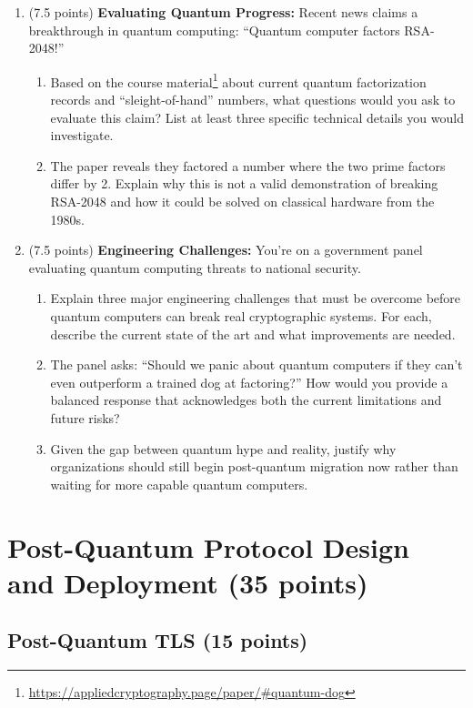 \documentclass[10pt,a4paper,american]{article}
\begin{document}
\begin{enumerate}
	\item (7.5 points) \textbf{Evaluating Quantum Progress:}
	      Recent news claims a breakthrough in quantum computing: ``Quantum computer factors RSA-2048!''
	      \begin{enumerate}
		      \item Based on the course material\footnote{\url{https://appliedcryptography.page/paper/\#quantum-dog}} about current quantum factorization records and ``sleight-of-hand'' numbers, what questions would you ask to evaluate this claim? List at least three specific technical details you would investigate.
		      \item The paper reveals they factored a number where the two prime factors differ by 2. Explain why this is not a valid demonstration of breaking RSA-2048 and how it could be solved on classical hardware from the 1980s.
	      \end{enumerate}
	\item (7.5 points) \textbf{Engineering Challenges:}
	      You're on a government panel evaluating quantum computing threats to national security.
	      \begin{enumerate}
		      \item Explain three major engineering challenges that must be overcome before quantum computers can break real cryptographic systems. For each, describe the current state of the art and what improvements are needed.
		      \item The panel asks: ``Should we panic about quantum computers if they can't even outperform a trained dog at factoring?'' How would you provide a balanced response that acknowledges both the current limitations and future risks?
		      \item Given the gap between quantum hype and reality, justify why organizations should still begin post-quantum migration now rather than waiting for more capable quantum computers.
	      \end{enumerate}
\end{enumerate}

\section{Post-Quantum Protocol Design and Deployment (35 points)}

\subsection{Post-Quantum TLS (15 points)}
\end{document}
